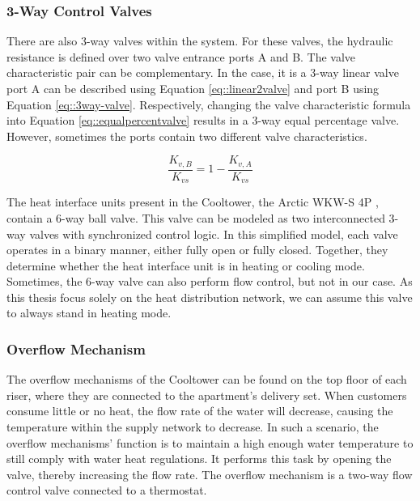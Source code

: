 \subsubsection{3-Way Control Valves}
There are also 3-way valves within the system. For these valves, the hydraulic resistance is defined over two valve entrance ports A and B.
The valve characteristic pair can be complementary. In the case, it is a 3-way linear valve port A can be described using Equation \ref{eq::linear2valve} and port B using Equation \ref{eq::3way-valve}. Respectively, changing the valve characteristic formula into Equation \ref{eq::equalpercentvalve} results in a 3-way equal percentage valve. However, sometimes the ports contain two different valve characteristics. 

\begin{equation}\label{eq::3way-valve}
    \frac{K_{v,B}}{K_{vs}} = 1 - \frac{K_{v,A}}{K_{vs}}
\end{equation}

The heat interface units present in the Cooltower, the Arctic WKW-S 4P \cite{fortes_wkw_s_4p}, contain a 6-way ball valve. This valve can be modeled as two interconnected 3-way valves with synchronized control logic. In this simplified model, each valve operates in a binary manner, either fully open or fully closed. Together, they determine whether the heat interface unit is in heating or cooling mode. Sometimes, the 6-way valve can also perform flow control, but not in our case. As this thesis focus solely on the heat distribution network, we can assume this valve to always stand in heating mode.


\subsubsection{Overflow Mechanism}
The overflow mechanisms of the Cooltower can be found on the top floor of each riser, where they are connected to the apartment's delivery set. When customers consume little or no heat, the flow rate of the water will decrease, causing the temperature within the supply network to decrease. In such a scenario, the overflow mechanisms' function is to maintain a high enough water temperature to still comply with water heat regulations. It performs this task by opening the valve, thereby increasing the flow rate. The overflow mechanism is a two-way flow control valve connected to a thermostat. 



 
